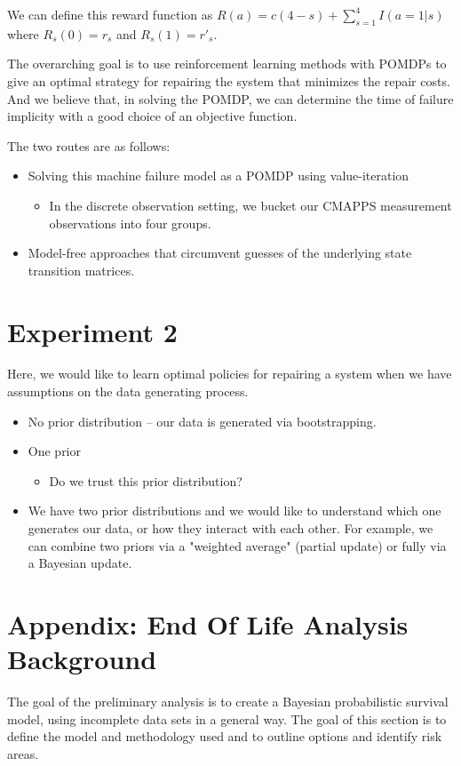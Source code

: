 \documentclass[english]{article}
\numberwithin{equation}{section}
\begin{document}
We can define this reward function as $R(a)=c(4-s) + \sum_{s=1}^4 I(a=1|s)$ where $R_s(0)=r_s$ and $R_s(1)=r'_s$.

The overarching goal is to use reinforcement learning methods with POMDPs to give an optimal strategy for repairing the system that minimizes the repair costs. And we believe that, in solving the POMDP, we can determine the time of failure implicity with a good choice of an objective function.

The two routes are as follows:
\begin{itemize}
	\item Solving this machine failure model as a POMDP using value-iteration
	\begin{itemize}
		\item In the discrete observation setting, we bucket our CMAPPS measurement observations into four groups.
	\end{itemize}
	\item Model-free approaches that circumvent guesses of the underlying state transition matrices.
\end{itemize}

\section*{Experiment 2}
Here, we would like to learn optimal policies for repairing a system when we have assumptions on the data generating process.
\begin{itemize}
	\item No prior distribution -- our data is generated via bootstrapping.
	\item One prior
	\begin{itemize}
		\item Do we trust this prior distribution?
	\end{itemize}
	\item We have two prior distributions and we would like to understand which one generates our data, or how they interact with each other. For example, we can combine two priors via a "weighted average" (partial update) or fully via a Bayesian update.
\end{itemize}

\section*{Appendix: End Of Life Analysis Background}
The goal of the preliminary analysis is to create a Bayesian probabilistic survival model, using incomplete data sets in a general way.  The goal of this section is to define the model and methodology used and to outline options and identify risk areas.
\end{document}
